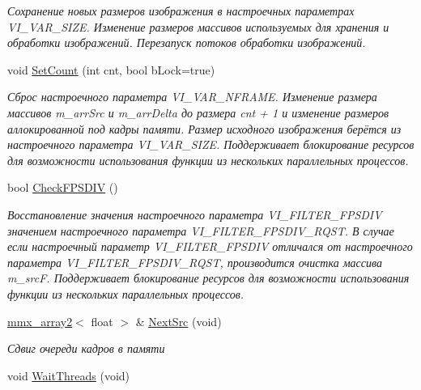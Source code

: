 \begin{DoxyCompactItemize}
\begin{DoxyCompactList}\small\item\em Сохранение новых размеров изображения в настроечных параметрах V\+I\+\_\+\+V\+A\+R\+\_\+\+S\+I\+Z\+E. Изменение размеров массивов используемых для хранения и обработки изображений. Перезапуск потоков обработки изображений. \end{DoxyCompactList}\item 
void \hyperlink{class_c_v_i_engine_base_a042d710f3a5be21538478ad157680828}{Set\+Count} (int cnt, bool b\+Lock=true)
\begin{DoxyCompactList}\small\item\em Сброс настроечного параметра V\+I\+\_\+\+V\+A\+R\+\_\+\+N\+F\+R\+A\+M\+E. Изменение размера массивов m\+\_\+arr\+Src и m\+\_\+arr\+Delta до размера cnt + 1 и изменение размеров аллокированной под кадры памяти. Размер исходного изображения берётся из настроечного параметра V\+I\+\_\+\+V\+A\+R\+\_\+\+S\+I\+Z\+E. Поддерживает блокирование ресурсов для возможности использования функции из нескольких параллельных процессов. \end{DoxyCompactList}\item 
bool \hyperlink{class_c_v_i_engine_base_a4764b56d4269ed5cd101dddf545e039d}{Check\+F\+P\+S\+D\+I\+V} ()
\begin{DoxyCompactList}\small\item\em Восстановление значения настроечного параметра V\+I\+\_\+\+F\+I\+L\+T\+E\+R\+\_\+\+F\+P\+S\+D\+I\+V значением настроечного параметра V\+I\+\_\+\+F\+I\+L\+T\+E\+R\+\_\+\+F\+P\+S\+D\+I\+V\+\_\+\+R\+Q\+S\+T. В случае если настроечный параметр V\+I\+\_\+\+F\+I\+L\+T\+E\+R\+\_\+\+F\+P\+S\+D\+I\+V отличался от настроечного параметра V\+I\+\_\+\+F\+I\+L\+T\+E\+R\+\_\+\+F\+P\+S\+D\+I\+V\+\_\+\+R\+Q\+S\+T, производится очистка массива m\+\_\+src\+F. Поддерживает блокирование ресурсов для возможности использования функции из нескольких параллельных процессов. \end{DoxyCompactList}\item 
\hyperlink{classmmx__array2}{mmx\+\_\+array2}$<$ float $>$ \& \hyperlink{class_c_v_i_engine_base_aa1aa2604f40dd77bc49ca6ff8fd81535}{Next\+Src} (void)
\begin{DoxyCompactList}\small\item\em Сдвиг очереди кадров в памяти \end{DoxyCompactList}\item 
void \hyperlink{class_c_v_i_engine_base_a305c1b2285ddfcdbb021597f0b3dbd39}{Wait\+Threads} (void)

\end{DoxyCompactItemize}
